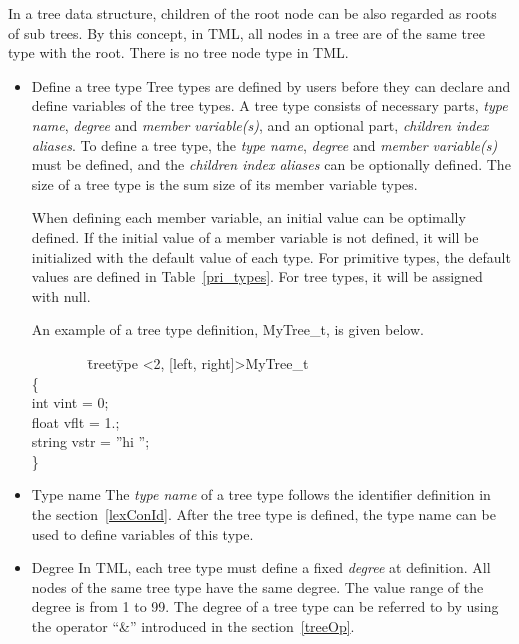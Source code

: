 \documentclass[12pt,psfig,a4]{article}
\begin{document}
In a tree data structure, children of the root node can be also regarded as roots of sub trees. By this concept, in TML, all nodes in a tree are of the same tree type with the root. There is no tree node type in TML.

\begin{itemize}
\item Define a tree type
\label{defTreetype}
Tree types are defined by users before they can declare and define variables of the tree types. A tree type consists of necessary parts, \textit{type name}, \textit{degree} and \textit{member variable(s)}, and an optional part, \textit{children index aliases}. To define a tree type, the \textit{type name}, \textit{degree} and \textit{member variable(s)} must be defined, and the \textit{children index aliases} can be optionally defined. The size of a tree type is the sum size of its member variable types.

When defining each member variable, an initial value can be optimally defined. If the initial value of a member variable is not defined, it will be initialized with the default value of each type. For primitive types, the default values are defined in Table~\ref{pri_types}. For tree types, it will be assigned with null.

An example of a tree type definition, MyTree\_t, is given below.

\begin{code}
\begin{tabbing}
~~~~~~~~\= treet\=ype \textless2, [left, right]\textgreater MyTree\_t \\
\> \{ \\
\> \>int vint = 0;\\
\> \>float vflt = 1.;\\
\> \>string vstr = ''hi '';\\
\> \}
\end{tabbing}
\end{code}

\item Type name
The \textit{type name} of a tree type follows the identifier definition in the section~\ref{lexConId}. After the tree type is defined, the type name can be used to define variables of this type.

\item Degree
In TML, each tree type must define a fixed \textit{degree} at definition. All nodes of the same tree type have the same degree. The value range of the degree is from 1 to 99. The degree of a tree type can be referred to by using  the operator ``\&'' introduced in the section~\ref{treeOp}.


\end{itemize}
\end{document}
